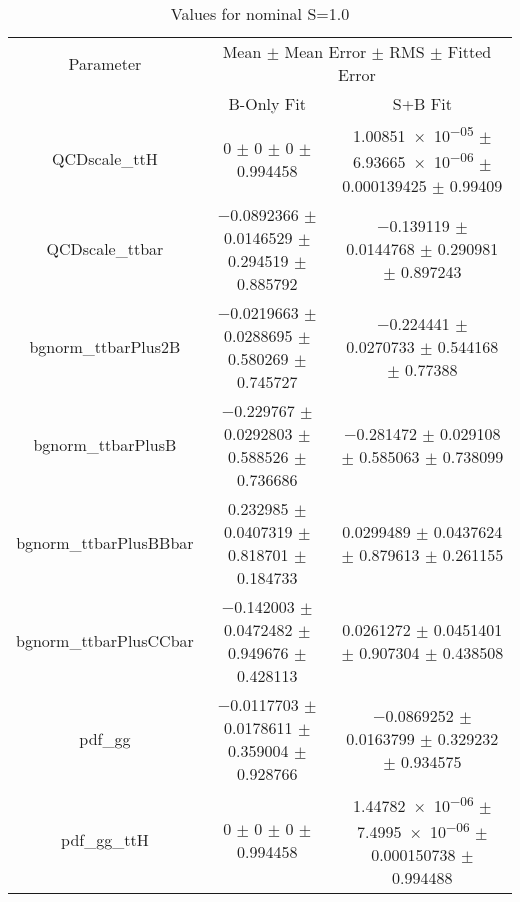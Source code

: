 \begin{table}
\centering
\caption{Values for nominal S=1.0}
\begin{tabular}{ccc}
\toprule
Parameter & \multicolumn{2}{c}{Mean $\pm$ Mean Error $\pm$ RMS $\pm$ Fitted Error}\\
 & B-Only Fit & S+B Fit\\
\midrule
QCDscale\_ttH & \num{0} $\pm$ \num{0} $\pm$ \num{0} $\pm$ \num{0.994458} & \num{1.00851e-05} $\pm$ \num{6.93665e-06} $\pm$ \num{0.000139425} $\pm$ \num{0.99409}\\
QCDscale\_ttbar & \num{-0.0892366} $\pm$ \num{0.0146529} $\pm$ \num{0.294519} $\pm$ \num{0.885792} & \num{-0.139119} $\pm$ \num{0.0144768} $\pm$ \num{0.290981} $\pm$ \num{0.897243}\\
bgnorm\_ttbarPlus2B & \num{-0.0219663} $\pm$ \num{0.0288695} $\pm$ \num{0.580269} $\pm$ \num{0.745727} & \num{-0.224441} $\pm$ \num{0.0270733} $\pm$ \num{0.544168} $\pm$ \num{0.77388}\\
bgnorm\_ttbarPlusB & \num{-0.229767} $\pm$ \num{0.0292803} $\pm$ \num{0.588526} $\pm$ \num{0.736686} & \num{-0.281472} $\pm$ \num{0.029108} $\pm$ \num{0.585063} $\pm$ \num{0.738099}\\
bgnorm\_ttbarPlusBBbar & \num{0.232985} $\pm$ \num{0.0407319} $\pm$ \num{0.818701} $\pm$ \num{0.184733} & \num{0.0299489} $\pm$ \num{0.0437624} $\pm$ \num{0.879613} $\pm$ \num{0.261155}\\
bgnorm\_ttbarPlusCCbar & \num{-0.142003} $\pm$ \num{0.0472482} $\pm$ \num{0.949676} $\pm$ \num{0.428113} & \num{0.0261272} $\pm$ \num{0.0451401} $\pm$ \num{0.907304} $\pm$ \num{0.438508}\\
pdf\_gg & \num{-0.0117703} $\pm$ \num{0.0178611} $\pm$ \num{0.359004} $\pm$ \num{0.928766} & \num{-0.0869252} $\pm$ \num{0.0163799} $\pm$ \num{0.329232} $\pm$ \num{0.934575}\\
pdf\_gg\_ttH & \num{0} $\pm$ \num{0} $\pm$ \num{0} $\pm$ \num{0.994458} & \num{1.44782e-06} $\pm$ \num{7.4995e-06} $\pm$ \num{0.000150738} $\pm$ \num{0.994488}\\
\bottomrule
\end{tabular}
\end{table}
